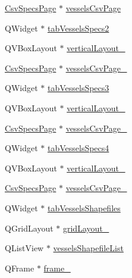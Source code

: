 \begin{DoxyCompactItemize}
\mbox{\hyperlink{class_csv_specs_page}{Csv\+Specs\+Page}} $\ast$ \mbox{\hyperlink{class_ui___vessel_editor_main_window_a5b4d76c7fd863a58ab49c43f16ddbfdc}{vessels\+Csv\+Page}}
\item 
Q\+Widget $\ast$ \mbox{\hyperlink{class_ui___vessel_editor_main_window_ac8937f91935668047b44d5c6d85a296c}{tab\+Vessels\+Specs2}}
\item 
Q\+V\+Box\+Layout $\ast$ \mbox{\hyperlink{class_ui___vessel_editor_main_window_a1e686ae3fea32f2623673a8ef09c2718}{vertical\+Layout\+\_}}
\item 
\mbox{\hyperlink{class_csv_specs_page}{Csv\+Specs\+Page}} $\ast$ \mbox{\hyperlink{class_ui___vessel_editor_main_window_a25da06774b33106bfcd8cea6d96dbae9}{vessels\+Csv\+Page\+\_}}
\item 
Q\+Widget $\ast$ \mbox{\hyperlink{class_ui___vessel_editor_main_window_a829a9b1fc5d7e221c7095532112a6624}{tab\+Vessels\+Specs3}}
\item 
Q\+V\+Box\+Layout $\ast$ \mbox{\hyperlink{class_ui___vessel_editor_main_window_a8ef5d0f2fe134013f2cbfed045c455a0}{vertical\+Layout\+\_}}
\item 
\mbox{\hyperlink{class_csv_specs_page}{Csv\+Specs\+Page}} $\ast$ \mbox{\hyperlink{class_ui___vessel_editor_main_window_a34ec20098571c06ede910573639d82b4}{vessels\+Csv\+Page\+\_}}
\item 
Q\+Widget $\ast$ \mbox{\hyperlink{class_ui___vessel_editor_main_window_a3909f86fc35c72125ddfef4e483ad503}{tab\+Vessels\+Specs4}}
\item 
Q\+V\+Box\+Layout $\ast$ \mbox{\hyperlink{class_ui___vessel_editor_main_window_a005bc6f8e8a8fad6a1394a06002c8b9b}{vertical\+Layout\+\_}}
\item 
\mbox{\hyperlink{class_csv_specs_page}{Csv\+Specs\+Page}} $\ast$ \mbox{\hyperlink{class_ui___vessel_editor_main_window_abe4b21e3b3542df89ccbf321f8cb6137}{vessels\+Csv\+Page\+\_}}
\item 
Q\+Widget $\ast$ \mbox{\hyperlink{class_ui___vessel_editor_main_window_aea1cb0ef41381f5f8c99360d4de9a1ae}{tab\+Vessels\+Shapefiles}}
\item 
Q\+Grid\+Layout $\ast$ \mbox{\hyperlink{class_ui___vessel_editor_main_window_aa64e4df7a78be23fe4a45f4151ba70e8}{grid\+Layout\+\_}}
\item 
Q\+List\+View $\ast$ \mbox{\hyperlink{class_ui___vessel_editor_main_window_ac3c1b8d674430081ce6c27047a209c16}{vessels\+Shapefile\+List}}
\item 
Q\+Frame $\ast$ \mbox{\hyperlink{class_ui___vessel_editor_main_window_a1a588eeb183e55f01832cbdcc627ca28}{frame\+\_}}

\end{DoxyCompactItemize}
